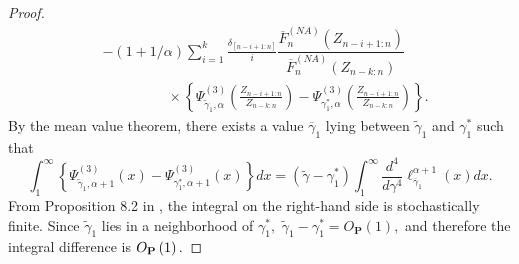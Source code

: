 \documentclass[reqno,openbib,runningheads,a4paper,12pt]{amsart}%
\begin{document}
\begin{proof}
\begin{align*}
&  -\left(  1+1/\alpha\right)  \sum_{i=1}^{k}\frac{\delta_{\left[
n-i+1:n\right]  }}{i}\dfrac{\overline{F}_{n}^{\left(  NA\right)  }\left(
Z_{n-i+1:n}\right)  }{\overline{F}_{n}^{\left(  NA\right)  }\left(
Z_{n-k:n}\right)  }\\
&  \ \ \ \ \ \ \ \ \ \ \ \ \ \ \ \ \ \ \ \ \ \times\left\{  \Psi
_{\widetilde{\gamma}_{1},\alpha}^{\left(  3\right)  }\left(  \frac
{Z_{n-i+1:n}}{Z_{n-k:n}}\right)  -\Psi_{\gamma_{1}^{\ast},\alpha}^{\left(
3\right)  }\left(  \frac{Z_{n-i+1:n}}{Z_{n-k:n}}\right)  \right\}  .
\end{align*}
By the mean value theorem, there exists a value $\overline{\gamma}_{1}$ lying
between $\widetilde{\gamma}_{1}$ and $\gamma_{1}^{\ast}$ such that
\[
\int_{1}^{\infty}\left\{  \Psi_{\widetilde{\gamma}_{1},\alpha+1}^{\left(
3\right)  }\left(  x\right)  -\Psi_{\gamma_{1}^{\ast},\alpha+1}^{\left(
3\right)  }\left(  x\right)  \right\}  dx=\left(  \widetilde{\gamma}%
-\gamma_{1}^{\ast}\right)  \int_{1}^{\infty}\frac{d^{4}}{d\gamma^{4}}%
\ell_{\overline{\gamma}_{1}}^{\alpha+1}\left(  x\right)  dx.
\]
From Proposition 8.2 in \cite{MNM2025}, the integral on the right-hand side is
stochastically finite. Since $\widetilde{\gamma}_{1}$ lies in a neighborhood
of $\gamma_{1}^{\ast},$ $\widetilde{\gamma}_{1}-\gamma_{1}^{\ast
}=O_{\mathbf{P}}\left(  1\right)  ,$ and therefore the integral difference is
$O_{\mathbf{P}}\left(  1\right)  .\medskip$


\end{proof}
\end{document}
